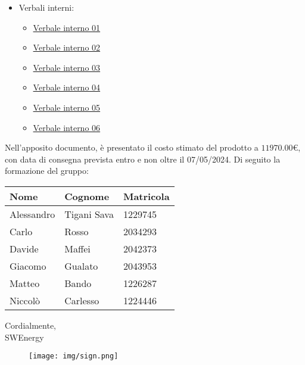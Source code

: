 \begin{itemize}
	\item Verbali interni:
		\begin{itemize}
			\item
				\href{https://github.com/Project-SWEnergy/documentazione/blob/main/Candidatura/Verbali/Interni/Verbale%20interno%20-%2001.pdf}{Verbale interno 01}
			\item
				\href{https://github.com/Project-SWEnergy/documentazione/blob/main/Candidatura/Verbali/Interni/Verbale%20interno%20-%2002.pdf}{Verbale interno 02}
			\item
				\href{https://github.com/Project-SWEnergy/documentazione/blob/main/Candidatura/Verbali/Interni/Verbale%20interno%20-%2003.pdf}{Verbale interno 03}
			\item
				\href{https://github.com/Project-SWEnergy/documentazione/blob/main/Candidatura/Verbali/Interni/Verbale%20interno%20-%2004.pdf}{Verbale interno 04}
			\item
				\href{https://github.com/Project-SWEnergy/documentazione/blob/main/Candidatura/Verbali/Interni/Verbale%20interno%20-%2005.pdf}{Verbale interno 05}
            \item
				\href{https://github.com/Project-SWEnergy/documentazione/blob/main/Candidatura/Verbali/Interni/Verbale%20interno%20-%2006.pdf}{Verbale interno 06}
		\end{itemize}
\end{itemize}


\noindent
Nell'apposito documento, è presentato il costo stimato del prodotto a 
$11970.00$\euro, 
con data di consegna prevista entro e non oltre il 07/05/2024. Di seguito la
formazione del gruppo:
\begin{center}
{
\renewcommand{\arraystretch}{1.5}
\begin{tabular}{lll}
	\textbf{Nome} & \textbf{Cognome}	& \textbf{Matricola}		\\
	\hline
	Alessandro	&	Tigani Sava		 	&	1229745					\\
	Carlo		&	Rosso			 	&	2034293					\\
	Davide		&	Maffei			 	& 	2042373					\\
	Giacomo 	&	Gualato			 	& 	2043953					\\
	Matteo		&	Bando				&	1226287					\\
	Niccolò 	&	Carlesso		 	& 	1224446					\\
	\hline
\end{tabular}
}
\end{center}

\vspace{1cm}

\noindent
Cordialmente, \\
SWEnergy

\begin{figure}[H]
	\texttt{[image: img/sign.png]}
\end{figure}
